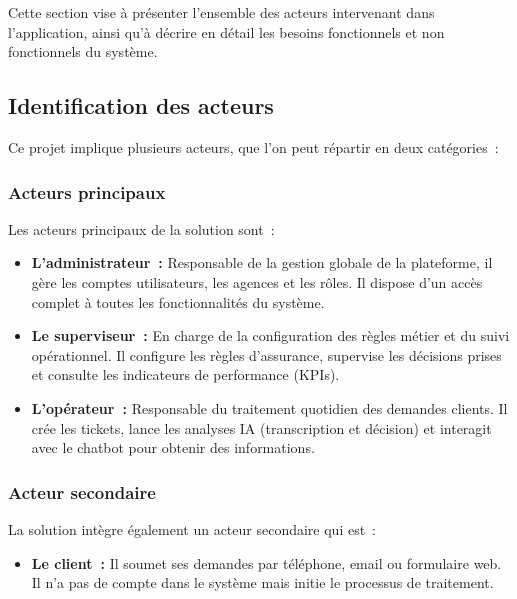 Cette section vise \`{a} pr\'{e}senter l'ensemble des acteurs intervenant dans l'application, ainsi qu'\`{a} d\'{e}crire en d\'{e}tail les besoins fonctionnels et non fonctionnels du syst\`{e}me.

\subsection{Identification des acteurs}

Ce projet implique plusieurs acteurs, que l'on peut r\'{e}partir en deux cat\'{e}gories~:

\subsubsection{Acteurs principaux}

Les acteurs principaux de la solution sont~:

\begin{itemize}[label=---]
    \item \textbf{L'administrateur~:} Responsable de la gestion globale de la plateforme, il g\`{e}re les comptes utilisateurs, les agences et les r\^{o}les. Il dispose d'un acc\`{e}s complet \`{a} toutes les fonctionnalit\'{e}s du syst\`{e}me.
    \item \textbf{Le superviseur~:} En charge de la configuration des r\`{e}gles m\'{e}tier et du suivi op\'{e}rationnel. Il configure les r\`{e}gles d'assurance, supervise les d\'{e}cisions prises et consulte les indicateurs de performance (KPIs).
    \item \textbf{L'op\'{e}rateur~:} Responsable du traitement quotidien des demandes clients. Il cr\'{e}e les tickets, lance les analyses IA (transcription et d\'{e}cision) et interagit avec le chatbot pour obtenir des informations.
\end{itemize}

\subsubsection{Acteur secondaire}

La solution int\`{e}gre \'{e}galement un acteur secondaire qui est~:

\begin{itemize}[label=---]
    \item \textbf{Le client~:} Il soumet ses demandes par t\'{e}l\'{e}phone, email ou formulaire web. Il n'a pas de compte dans le syst\`{e}me mais initie le processus de traitement.
\end{itemize}

